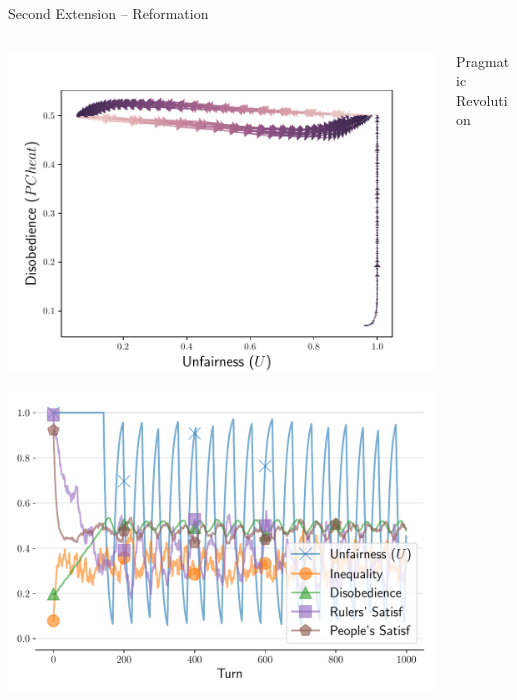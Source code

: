 \documentclass[xcolor={table}]{beamer}
\begin{document}
\begin{frame}[fragile=singleslide,t]
\begin{columns}[T]
\begin{column}{.58\textwidth}
\begin{block}{Second Extension -- Reformation}
\begin{columns}[T]
\begin{column}{.333\textwidth}
\begin{center}
\includegraphics[width=\linewidth]{img/trajtories.pdf}\label{fig:toriesphase}

\includegraphics[width=.9\linewidth]{img/timetories.pdf}\label{fig:toriestime}
\end{center}


\end{column}

\begin{column}{.333\textwidth}

\begin{center}
Pragmatic Revolution


\end{center}
\end{column}
\end{columns}
\end{block}
\end{column}
\end{columns}
\end{frame}
\end{document}
